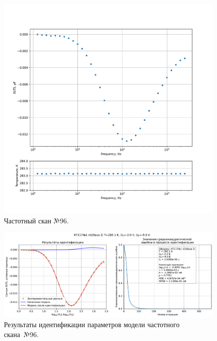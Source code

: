 \begin{figure}[!ht]
    \centering
    \includegraphics[width=1\textwidth]{../plots/КТ117№1_п1(база 2)_2500Гц-1Гц_1пФ_+10С_-2В-9В_200мВ_20мкс_шаг_0,1.pdf}
    \caption{Частотный скан №96.}
    \label{pic:frequency_scan_96}
\end{figure}

\begin{figure}[!ht]
    \centering
    \includegraphics[width=1\textwidth]{../plots/КТ117№1_п1(база 2)_2500Гц-1Гц_1пФ_+10С_-2В-9В_200мВ_20мкс_шаг_0,1_model.pdf}
    \caption{Результаты идентификации параметров модели частотного скана~№96.}
    \label{pic:frequency_scan_model96}
\end{figure}

\pagebreak


